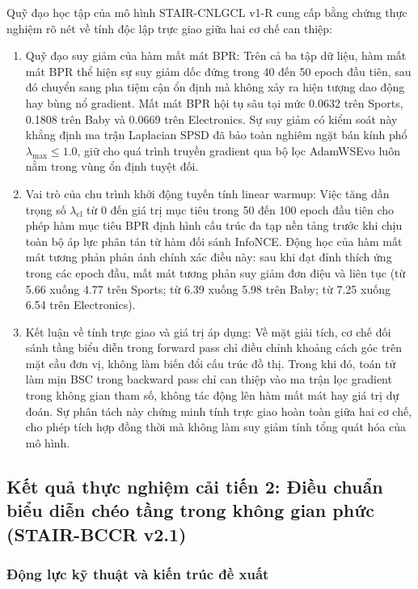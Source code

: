 Quỹ đạo học tập của mô hình STAIR-CNLGCL v1-R cung cấp bằng chứng thực nghiệm rõ nét về tính độc lập trực giao giữa hai cơ chế can thiệp:
\begin{enumerate}[leftmargin=*]
    \item Quỹ đạo suy giảm của hàm mất mát BPR: Trên cả ba tập dữ liệu, hàm mất mát BPR thể hiện sự suy giảm dốc đứng trong 40 đến 50 epoch đầu tiên, sau đó chuyển sang pha tiệm cận ổn định mà không xảy ra hiện tượng dao động hay bùng nổ gradient. Mất mát BPR hội tụ sâu tại mức 0.0632 trên Sports, 0.1808 trên Baby và 0.0669 trên Electronics. Sự suy giảm có kiểm soát này khẳng định ma trận Laplacian SPSD đã bảo toàn nghiêm ngặt bán kính phổ $\lambda_{\max} \le 1.0$, giữ cho quá trình truyền gradient qua bộ lọc AdamWSEvo luôn nằm trong vùng ổn định tuyệt đối.
    \item Vai trò của chu trình khởi động tuyến tính linear warmup: Việc tăng dần trọng số $\lambda_{\text{cl}}$ từ 0 đến giá trị mục tiêu trong 50 đến 100 epoch đầu tiên cho phép hàm mục tiêu BPR định hình cấu trúc đa tạp nền tảng trước khi chịu toàn bộ áp lực phân tán từ hàm đối sánh InfoNCE. Động học của hàm mất mát tương phản phản ánh chính xác điều này: sau khi đạt đỉnh thích ứng trong các epoch đầu, mất mát tương phản suy giảm đơn điệu và liên tục (từ 5.66 xuống 4.77 trên Sports; từ 6.39 xuống 5.98 trên Baby; từ 7.25 xuống 6.54 trên Electronics).
    \item Kết luận về tính trực giao và giá trị áp dụng: Về mặt giải tích, cơ chế đối sánh tầng biểu diễn trong forward pass chỉ điều chỉnh khoảng cách góc trên mặt cầu đơn vị, không làm biến đổi cấu trúc đồ thị. Trong khi đó, toán tử làm mịn BSC trong backward pass chỉ can thiệp vào ma trận lọc gradient trong không gian tham số, không tác động lên hàm mất mát hay giá trị dự đoán. Sự phân tách này chứng minh tính trực giao hoàn toàn giữa hai cơ chế, cho phép tích hợp đồng thời mà không làm suy giảm tính tổng quát hóa của mô hình.
\end{enumerate}

\subsection{Kết quả thực nghiệm cải tiến 2: Điều chuẩn biểu diễn chéo tầng trong không gian phức (STAIR-BCCR v2.1)}

\subsubsection{Động lực kỹ thuật và kiến trúc đề xuất}

